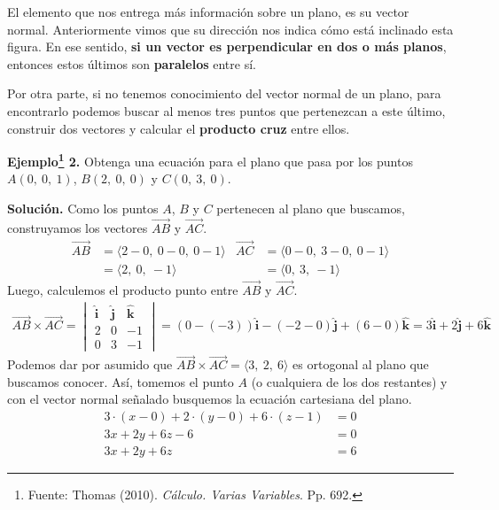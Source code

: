 \documentclass[12pt]{article}
\begin{document}
El elemento que nos entrega más información sobre un plano, es su vector normal. Anteriormente vimos que su dirección nos indica cómo está inclinado esta figura. En ese sentido, \textbf{si un vector es perpendicular en dos o más planos}, entonces estos últimos son \textbf{paralelos} entre sí.

Por otra parte, si no tenemos conocimiento del vector normal de un plano, para encontrarlo podemos buscar al menos tres puntos que pertenezcan a este último, construir dos vectores y calcular el \textbf{producto cruz} entre ellos.

\textbf{Ejemplo\footnote{Fuente: Thomas (2010). \textit{Cálculo. Varias Variables}. Pp. 692.} 2.} Obtenga una ecuación para el plano que pasa por los puntos $A(0, \ 0, \ 1)$, $B(2, \ 0, \ 0)$ y $C(0, \ 3, \ 0)$.

\textbf{Solución.} Como los puntos $A$, $B$ y $C$ pertenecen al plano que buscamos, construyamos los vectores $\overrightarrow{AB}$ y $\overrightarrow{AC}$.
\begin{align*}
  \overrightarrow{AB} &= \langle 2 - 0, \ 0 - 0, \ 0 - 1 \rangle & \overrightarrow{AC} &= \langle 0 - 0, \ 3 - 0, \ 0 - 1 \rangle \\
                      &= \langle 2, \ 0, \ -1 \rangle &                                &= \langle 0, \ 3, \ -1 \rangle
\end{align*}
Luego, calculemos el producto punto entre $\overrightarrow{AB}$ y $\overrightarrow{AC}$.
\begin{align*}
\overrightarrow{AB} \times \overrightarrow{AC} =
\begin{vmatrix}
\hat{\mathbf{i}} & \hat{\mathbf{j}} & \hat{\mathbf{k}} \\
2 & 0 & -1 \\
0 & 3 & -1
\end{vmatrix} =
(0 - (-3)) \hat{\mathbf{i}} - (-2 - 0) \hat{\mathbf{j}} + (6 - 0) \hat{\mathbf{k}} =
3 \hat{\mathbf{i}} + 2 \hat{\mathbf{j}} + 6 \hat{\mathbf{k}}
\end{align*}
Podemos dar por asumido que $\overrightarrow{AB} \times \overrightarrow{AC} = \langle 3, \ 2, \ 6 \rangle$ es ortogonal al plano que buscamos conocer. Así, tomemos el punto $A$ (o cualquiera de los dos restantes) y con el vector normal señalado busquemos la ecuación cartesiana del plano.
\begin{align*}
3 \cdot (x - 0) + 2 \cdot (y - 0) + 6 \cdot (z - 1) &= 0 \\
3x + 2y + 6z - 6 &= 0 \\
3x + 2y + 6z &= 6
\end{align*}
\end{document}
